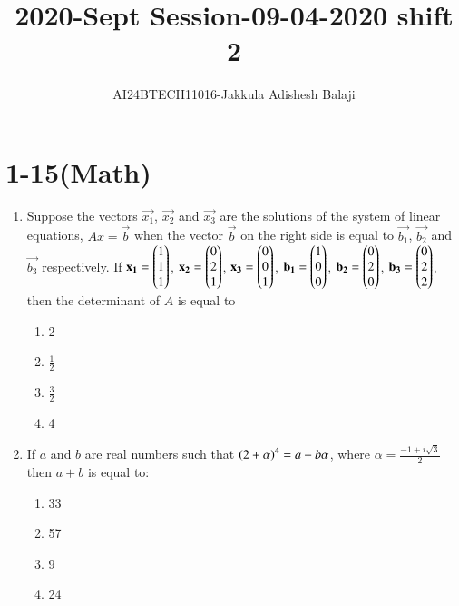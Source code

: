 \documentclass[journal]{IEEEtran}
\begin{document}

\title{2020-Sept Session-09-04-2020 shift 2}
\author{AI24BTECH11016-Jakkula Adishesh Balaji}
{\let\newpage\relax\maketitle}
\renewcommand{\thefigure}{\theenumi}
\renewcommand{\thetable}{\theenumi}
\setlength{\intextsep}{10pt} %
\renewcommand{\thetable}{\theenumi}
\section{1-15(Math)}
\begin{enumerate}
	\item
	Suppose the vectors $\vec{x_1}$, $\vec{x_2}$ and $\vec{x_3}$ are the solutions of the system of linear equations, $Ax = \vec{b}$ when the vector $\vec{b}$ on the right side is equal to $\vec{b_1}$, $\vec{b_2}$ and $\vec{b_3}$ respectively. If $\mathbf{x_1} = \begin{pmatrix}1 \\ 1 \\ 1\end{pmatrix}$, $\mathbf{x_2} = \begin{pmatrix}0 \\ 2 \\ 1\end{pmatrix}$, $\mathbf{x_3} = \begin{pmatrix}0 \\ 0 \\ 1\end{pmatrix}$, $\mathbf{b_1} = \begin{pmatrix}1 \\ 0 \\ 0\end{pmatrix}$, $\mathbf{b_2} = \begin{pmatrix}0 \\ 2 \\ 0\end{pmatrix}$, $\mathbf{b_3} = \begin{pmatrix}0 \\ 2 \\2\end{pmatrix}$, then the determinant of $A$ is equal to 
		\begin{enumerate}
			\item 2
			\item $\frac{1}{2}$
			\item $\frac{3}{2}$
			\item 4
		\end{enumerate}
	\item
	 If $a$ and $b$ are real numbers such that $\left(2+\alpha\right)^{4} = a+b\alpha$, where $\alpha = \frac{-1+i\sqrt{3}}{2}$ then $a+b$ is equal to:
	 	\begin{enumerate}
	 		\item 33
	 		\item 57
	 		\item 9
	 		\item 24

\end{enumerate}
\end{enumerate}
\end{document}

